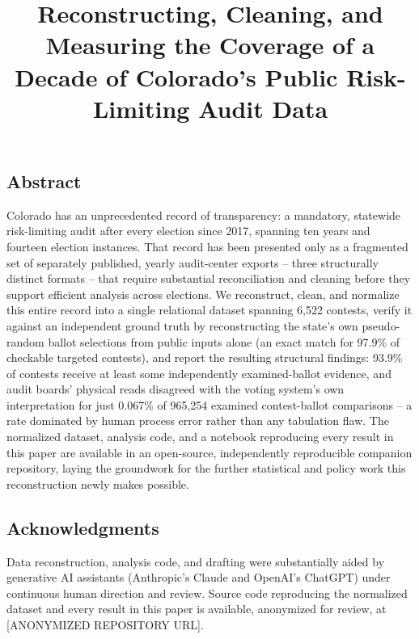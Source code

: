 \documentclass[letterpaper,twocolumn,10pt]{article}
\begin{document}
\date{}
\title{\Large \bf Reconstructing, Cleaning, and Measuring the Coverage of a Decade of Colorado's Public Risk-Limiting Audit Data}


\maketitle
\thispagestyle{empty}

\subsection*{Abstract}
Colorado has an unprecedented record of transparency: a mandatory,
statewide risk-limiting audit after every election since 2017, spanning
ten years and fourteen election instances. That record has been
presented only as a fragmented set of separately published, yearly
audit-center exports -- three structurally distinct formats -- that
require substantial reconciliation and cleaning before they support
efficient analysis across elections. We reconstruct, clean, and
normalize this entire record into a single relational dataset spanning
6,522 contests, verify it against an independent ground truth by
reconstructing the state's own pseudo-random ballot selections from
public inputs alone (an exact match for 97.9\% of checkable targeted
contests), and report the resulting structural findings: 93.9\% of
contests receive at least some independently examined-ballot evidence,
and audit boards' physical reads disagreed with the voting system's own
interpretation for just 0.067\% of 965,254 examined contest-ballot
comparisons -- a rate dominated by human process error rather than any
tabulation flaw. The normalized dataset, analysis code, and a notebook
reproducing every result in this paper are available in an open-source,
independently reproducible companion repository, laying the groundwork
for the further statistical and policy work this reconstruction newly
makes possible.



\subsection*{Acknowledgments}
Data reconstruction, analysis code, and drafting were substantially aided
by generative AI assistants (Anthropic's Claude and OpenAI's ChatGPT)
under continuous human direction and review. Source code reproducing the
normalized dataset and every result in this paper is available,
anonymized for review, at [ANONYMIZED REPOSITORY URL].

{\footnotesize

}
\end{document}

